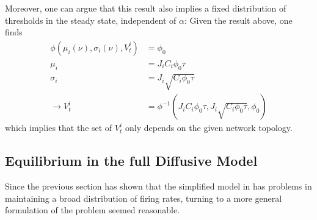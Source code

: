 \documentclass[10pt,a4paper]{article}
\begin{document}
Moreover, one can argue that this result also implies a fixed distribution of thresholds in the steady state, independent of $\alpha$: Given the result above, one finds
\begin{align}
\phi(\mu_i(\nu),\sigma_i(\nu),V_t^i) &= \phi_0 \label{fixed_thresh_dist_argument1} \\
\mu_i &= J_iC_i \phi_0 \tau \label{fixed_thresh_dist_argument2} \\
\sigma_i &= J_i\sqrt{C_i \phi_0  \tau} \label{fixed_thresh_dist_argument3} \\
\rightarrow V_t^i &= {\phi}^{-1}(J_iC_i \phi_0 \tau,J_i\sqrt{C_i \phi_0  \tau},\phi_0) \label{fixed_thresh_dist_argument4}
\end{align}
which implies that the set of $V_t^i$ only depends on the given network topology.

\subsection{Equilibrium in the full Diffusive Model} \label{Matrix_Diff_Model_Section}
Since the previous section has shown that the simplified model in \cite{Sweeney_Paper} has problems in maintaining a broad distribution of firing rates, turning to a more general formulation of the problem seemed reasonable.
\end{document}
